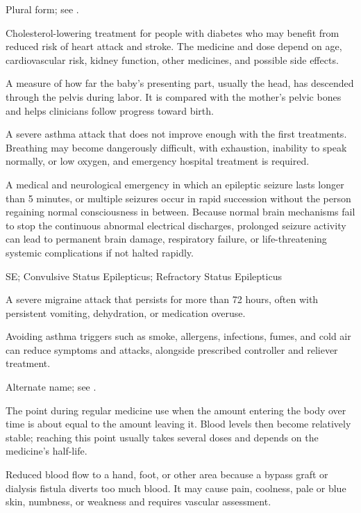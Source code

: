  Plural form; see .

 Cholesterol-lowering treatment for people with diabetes who may benefit from reduced risk of heart attack and stroke. The medicine and dose depend on age, cardiovascular risk, kidney function, other medicines, and possible side effects.

 A measure of how far the baby’s presenting part, usually the head, has descended through the pelvis during labor. It is compared with the mother’s pelvic bones and helps clinicians follow progress toward birth.

 A severe asthma attack that does not improve enough with the first treatments. Breathing may become dangerously difficult, with exhaustion, inability to speak normally, or low oxygen, and emergency hospital treatment is required.

 A medical and neurological emergency in which an epileptic seizure lasts longer than 5 minutes, or multiple seizures occur in rapid succession without the person regaining normal consciousness in between. Because normal brain mechanisms fail to stop the continuous abnormal electrical discharges, prolonged seizure activity can lead to permanent brain damage, respiratory failure, or life-threatening systemic complications if not halted rapidly.

\synonyms
SE; Convulsive Status Epilepticus; Refractory Status Epilepticus

 A severe migraine attack that persists for more than 72 hours, often with persistent vomiting, dehydration, or medication overuse.

 Avoiding asthma triggers such as smoke, allergens, infections, fumes, and cold air can reduce symptoms and attacks, alongside prescribed controller and reliever treatment.

 Alternate name; see .

 The point during regular medicine use when the amount entering the body over time is about equal to the amount leaving it. Blood levels then become relatively stable; reaching this point usually takes several doses and depends on the medicine’s half-life.

 Reduced blood flow to a hand, foot, or other area because a bypass graft or dialysis fistula diverts too much blood. It may cause pain, coolness, pale or blue skin, numbness, or weakness and requires vascular assessment.

